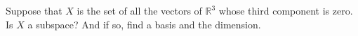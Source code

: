\documentclass{ximera}
\begin{document}

\begin{exercise}
    Suppose that $X$ is the set of all the vectors of ${\mathbb{R}}^3$ whose third component is zero.  Is $X$ a subspace?  And if so, find a basis and the dimension.
\end{exercise}
\end{document}
